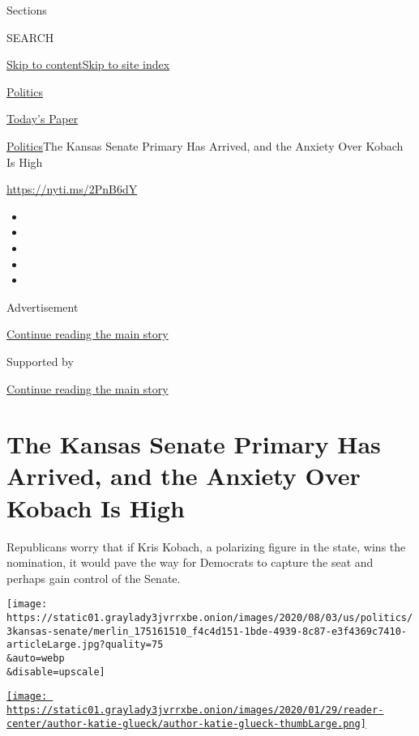 Sections

SEARCH

\protect\hyperlink{site-content}{Skip to
content}\protect\hyperlink{site-index}{Skip to site index}

\href{https://www.nytimes3xbfgragh.onion/section/politics}{Politics}

\href{https://myaccount.nytimes3xbfgragh.onion/auth/login?response_type=cookie\&client_id=vi}{}

\href{https://www.nytimes3xbfgragh.onion/section/todayspaper}{Today's
Paper}

\href{/section/politics}{Politics}\textbar{}The Kansas Senate Primary
Has Arrived, and the Anxiety Over Kobach Is High

\url{https://nyti.ms/2PnB6dY}

\begin{itemize}
\item
\item
\item
\item
\item
\end{itemize}

Advertisement

\protect\hyperlink{after-top}{Continue reading the main story}

Supported by

\protect\hyperlink{after-sponsor}{Continue reading the main story}

\hypertarget{the-kansas-senate-primary-has-arrived-and-the-anxiety-over-kobach-is-high}{%
\section{The Kansas Senate Primary Has Arrived, and the Anxiety Over
Kobach Is
High}\label{the-kansas-senate-primary-has-arrived-and-the-anxiety-over-kobach-is-high}}

Republicans worry that if Kris Kobach, a polarizing figure in the state,
wins the nomination, it would pave the way for Democrats to capture the
seat and perhaps gain control of the Senate.

\texttt{[image: https://static01.graylady3jvrrxbe.onion/images/2020/08/03/us/politics/3kansas-senate/merlin\_175161510\_f4c4d151-1bde-4939-8c87-e3f4369c7410-articleLarge.jpg?quality=75\\\&auto=webp\\\&disable=upscale]}

\href{https://www.nytimes3xbfgragh.onion/by/katie-glueck}{\texttt{[image: https://static01.graylady3jvrrxbe.onion/images/2020/01/29/reader-center/author-katie-glueck/author-katie-glueck-thumbLarge.png]}}

